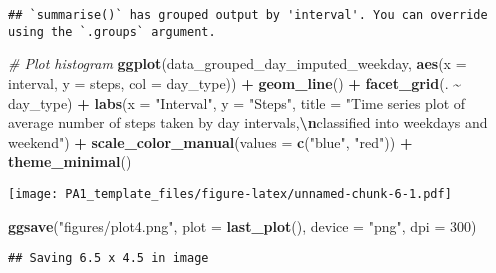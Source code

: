 \documentclass[
]{article}
\newenvironment{Shaded}{\begin{snugshade}}{\end{snugshade}}
\newcommand{\AttributeTok}[1]{\textcolor[rgb]{0.13,0.29,0.53}{#1}}
\newcommand{\CommentTok}[1]{\textcolor[rgb]{0.56,0.35,0.01}{\textit{#1}}}
\newcommand{\DecValTok}[1]{\textcolor[rgb]{0.00,0.00,0.81}{#1}}
\newcommand{\FunctionTok}[1]{\textcolor[rgb]{0.13,0.29,0.53}{\textbf{#1}}}
\newcommand{\NormalTok}[1]{#1}
\newcommand{\SpecialCharTok}[1]{\textcolor[rgb]{0.81,0.36,0.00}{\textbf{#1}}}
\newcommand{\StringTok}[1]{\textcolor[rgb]{0.31,0.60,0.02}{#1}}
\begin{document}
\begin{verbatim}
## `summarise()` has grouped output by 'interval'. You can override using the `.groups` argument.
\end{verbatim}

\begin{Shaded}
\begin{Highlighting}[]
\CommentTok{\# Plot histogram}
\FunctionTok{ggplot}\NormalTok{(data\_grouped\_day\_imputed\_weekday, }\FunctionTok{aes}\NormalTok{(}\AttributeTok{x =}\NormalTok{ interval, }\AttributeTok{y =}\NormalTok{ steps, }\AttributeTok{col =}\NormalTok{ day\_type)) }\SpecialCharTok{+}
  \FunctionTok{geom\_line}\NormalTok{() }\SpecialCharTok{+}
  \FunctionTok{facet\_grid}\NormalTok{(. }\SpecialCharTok{\textasciitilde{}}\NormalTok{ day\_type) }\SpecialCharTok{+}
  \FunctionTok{labs}\NormalTok{(}\AttributeTok{x =} \StringTok{"Interval"}\NormalTok{, }\AttributeTok{y =} \StringTok{"Steps"}\NormalTok{, }\AttributeTok{title =} \StringTok{"Time series plot of average number of steps taken by day intervals,}\SpecialCharTok{\textbackslash{}n}\StringTok{classified into weekdays and weekend"}\NormalTok{) }\SpecialCharTok{+}
  \FunctionTok{scale\_color\_manual}\NormalTok{(}\AttributeTok{values =} \FunctionTok{c}\NormalTok{(}\StringTok{"blue"}\NormalTok{, }\StringTok{"red"}\NormalTok{)) }\SpecialCharTok{+}
  \FunctionTok{theme\_minimal}\NormalTok{()}
\end{Highlighting}
\end{Shaded}

\texttt{[image: PA1\_template\_files/figure-latex/unnamed-chunk-6-1.pdf]}

\begin{Shaded}
\begin{Highlighting}[]
\FunctionTok{ggsave}\NormalTok{(}\StringTok{"figures/plot4.png"}\NormalTok{, }\AttributeTok{plot =} \FunctionTok{last\_plot}\NormalTok{(), }\AttributeTok{device =} \StringTok{"png"}\NormalTok{, }\AttributeTok{dpi =} \DecValTok{300}\NormalTok{)}
\end{Highlighting}
\end{Shaded}

\begin{verbatim}
## Saving 6.5 x 4.5 in image
\end{verbatim}
\end{document}
